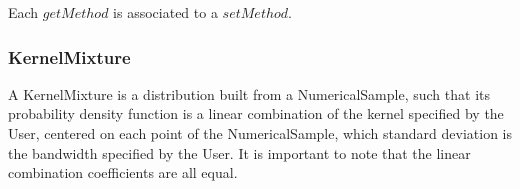 Each  $getMethod$  is associated to a $setMethod$.




\newpage \subsubsection{KernelMixture}


A KernelMixture is a distribution built from a NumericalSample, such that its probability density function is a linear combination of the kernel specified by the User, centered on each point of the NumericalSample, which standard deviation is the bandwidth specified by the User.
It is important to note that the linear combination coefficients are all equal.



